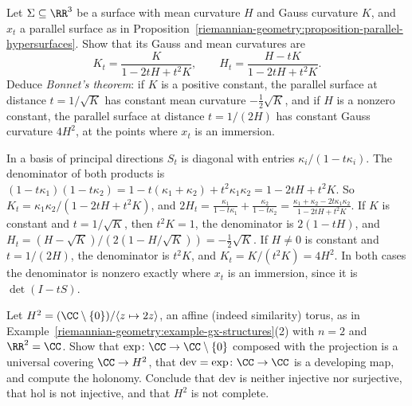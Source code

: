 \begin{exercise}\label{riemannian-geometry:exercise-parallel-surface-curvature}
Let $\Sigma \subseteq \RR^3$ be a surface with mean curvature $H$ and Gauss curvature $K$, and $x_t$ a parallel surface as in Proposition~\ref{riemannian-geometry:proposition-parallel-hypersurfaces}. Show that its Gauss and
mean curvatures are
\[
K_t = \frac{K}{1 - 2tH + t^2K}, \qquad H_t = \frac{H - tK}{1 - 2tH + t^2K} .
\]
Deduce \emph{Bonnet's theorem}: if $K$ is a positive constant, the parallel surface at distance $t = 1/\sqrt K$ has constant mean curvature $-\frac12\sqrt K$, and if $H$ is a nonzero constant, the
parallel surface at distance $t = 1/(2H)$ has constant Gauss curvature $4H^2$, at the points where $x_t$ is an immersion.
\end{exercise}

\begin{solution}
In a basis of principal directions $S_t$ is diagonal with entries $\kappa_i/(1 - t\kappa_i)$. The denominator of both products is $(1 - t\kappa_1)(1 - t\kappa_2) = 1 - t(\kappa_1 + \kappa_2) + t^2\kappa_1\kappa_2 = 1 - 2tH + t^2K$. So
$K_t = \kappa_1\kappa_2/(1 - 2tH + t^2K)$, and $2H_t = \frac{\kappa_1}{1 - t\kappa_1} + \frac{\kappa_2}{1 - t\kappa_2} = \frac{\kappa_1 + \kappa_2 - 2t\kappa_1\kappa_2}{1 - 2tH + t^2K}$. If $K$ is constant and $t = 1/\sqrt K$, then $t^2K = 1$, the
denominator is $2(1 - tH)$, and $H_t = (H - \sqrt K)/(2(1 - H/\sqrt K)) = -\frac12\sqrt K$. If $H \neq 0$ is constant and $t = 1/(2H)$, the denominator is $t^2K$, and $K_t = K/(t^2K) = 4H^2$. In both cases
the denominator is nonzero exactly where $x_t$ is an immersion, since it is $\det(I - tS)$.
\end{solution}

\begin{exercise}\label{riemannian-geometry:exercise-hopf-torus}
Let $H^2 = (\CC \setminus \{0\})/\langle z \mapsto 2z\rangle$, an affine (indeed similarity) torus, as in Example~\ref{riemannian-geometry:example-gx-structures}(2) with $n = 2$ and $\RR^2 = \CC$. Show that $\exp \colon \CC \to \CC \setminus \{0\}$
composed with the projection is a universal covering $\CC \to H^2$, that $\mathrm{dev} = \exp \colon \CC \to \CC$ is a developing map, and compute the holonomy. Conclude that $\mathrm{dev}$ is neither injective nor surjective, that
$\mathrm{hol}$ is not injective, and that $H^2$ is not complete.
\end{exercise}

